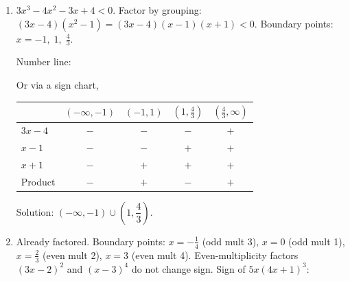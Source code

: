 \documentclass{ximera}
\begin{document}
\begin{problem}
\begin{solution}
\begin{enumerate}
  \item[(b)] $3x^3-4x^2-3x+4 < 0$. Factor by grouping: $(3x-4)(x^2-1)=(3x-4)(x-1)(x+1)<0$. Boundary points: $x=-1,\;1,\;\tfrac{4}{3}$.

  Number line:
\begin{center}
\end{center}

  Or via a sign chart,
\begin{center}
\renewcommand{\arraystretch}{1.3}
\begin{tabular}{l|cccc}
 & $(-\infty,-1)$ & $(-1,1)$ & $(1,\tfrac{4}{3})$ & $(\tfrac{4}{3},\infty)$ \\\hline
$3x-4$ & {\color{red}$-$} & {\color{red}$-$} & {\color{red}$-$} & {\color{blue}$+$} \\
$x-1$ & {\color{red}$-$} & {\color{red}$-$} & {\color{blue}$+$} & {\color{blue}$+$} \\
$x+1$ & {\color{red}$-$} & {\color{blue}$+$} & {\color{blue}$+$} & {\color{blue}$+$} \\\hline
Product & {\color{red}$-$} & {\color{blue}$+$} & {\color{red}$-$} & {\color{blue}$+$}
\end{tabular}
\end{center}
  Solution: $(-\infty,-1)\cup\!\left(1,\dfrac{4}{3}\right)$.

  \item[(c)] Already factored. Boundary points: $x=-\tfrac{1}{4}$ (odd mult 3), $x=0$ (odd mult 1), $x=\tfrac{2}{3}$ (even mult 2), $x=3$ (even mult 4).
  Even-multiplicity factors $(3x-2)^2$ and $(x-3)^4$ do not change sign. Sign of $5x(4x+1)^3$:


\end{enumerate}
\end{solution}
\end{problem}
\end{document}
